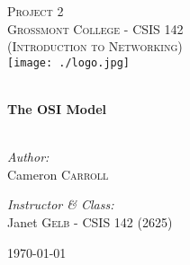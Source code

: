 \begin{titlepage}
\begin{center}

\textsc{\Large Project 2 }\\[1.5cm]
\textsc{\Large Grossmont College - CSIS 142}\\
\textsc{(Introduction to Networking)}\\[0.5cm]
\texttt{[image: ./logo.jpg]}

\HRule \\[0.4cm]
{ \LARGE \bfseries The OSI Model}\\[0.5cm]

\HRule \\[1.5cm]

\begin{minipage}{0.4\textwidth}
\begin{flushleft} \large
\emph{Author:}\\
Cameron \textsc{Carroll}
\end{flushleft}
\end{minipage}
\begin{minipage}{0.4\textwidth}
\begin{flushright} \large
\emph{Instructor \& Class:}\\
Janet \textsc{Gelb} - CSIS 142 (2625)
\end{flushright}
\end{minipage}

\vfill

{\large \today}

\end{center}
\end{titlepage}